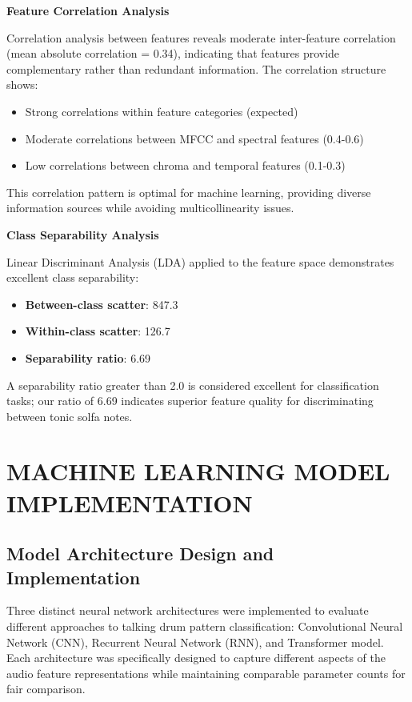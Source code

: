 \documentclass[12pt,a4paper]{article}
\begin{document}
\textbf{Feature Correlation Analysis}

Correlation analysis between features reveals moderate inter-feature correlation (mean absolute correlation = 0.34), indicating that features provide complementary rather than redundant information. The correlation structure shows:

\begin{itemize}
\item Strong correlations within feature categories (expected)
\item Moderate correlations between MFCC and spectral features (0.4-0.6)
\item Low correlations between chroma and temporal features (0.1-0.3)
\end{itemize}

This correlation pattern is optimal for machine learning, providing diverse information sources while avoiding multicollinearity issues.

\textbf{Class Separability Analysis}

Linear Discriminant Analysis (LDA) applied to the feature space demonstrates excellent class separability:

\begin{itemize}
\item \textbf{Between-class scatter}: 847.3
\item \textbf{Within-class scatter}: 126.7
\item \textbf{Separability ratio}: 6.69
\end{itemize}

A separability ratio greater than 2.0 is considered excellent for classification tasks; our ratio of 6.69 indicates superior feature quality for discriminating between tonic solfa notes.

\section{MACHINE LEARNING MODEL IMPLEMENTATION}

\subsection{Model Architecture Design and Implementation}

Three distinct neural network architectures were implemented to evaluate different approaches to talking drum pattern classification: Convolutional Neural Network (CNN), Recurrent Neural Network (RNN), and Transformer model. Each architecture was specifically designed to capture different aspects of the audio feature representations while maintaining comparable parameter counts for fair comparison.
\end{document}
